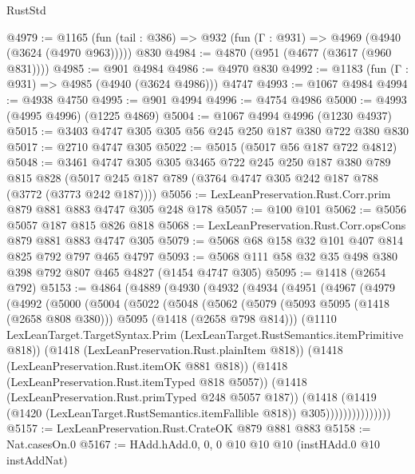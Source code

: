 \begin{lexlean}{RustStd}
\begin{coremodule}
@4979 := @1165
    (fun (tail : @386) => @932 (fun (Γ : @931) => @4969 (@4940 (@3624 (@4970 @963)))))
    @830
@4984 := @4870 (@951 (@4677 (@3617 (@960 @831))))
@4985 := @901 @4984
@4986 := @4970 @830
@4992 := @1183 (fun (Γ : @931) => @4985 (@4940 (@3624 @4986))) @4747
@4993 := @1067 @4984
@4994 := @4938 @4750
@4995 := @901 @4994
@4996 := @4754 @4986
@5000 := @4993 (@4995 @4996) (@1225 @4869)
@5004 := @1067 @4994 @4996 (@1230 @4937)
@5015 := @3403 @4747 @305 @305 @56 @245 @250 @187 @380 @722 @380 @830
@5017 := @2710 @4747 @305
@5022 := @5015 (@5017 @56 @187 @722 @4812)
@5048 := @3461
    @4747
    @305
    @305
    @3465
    @722
    @245
    @250
    @187
    @380
    @789
    @815
    @828
    (@5017 @245 @187 @789 (@3764 @4747 @305 @242 @187 @788 (@3772 (@3773 @242 @187))))
@5056 := LexLeanPreservation.Rust.Corr.prim @879 @881 @883 @4747 @305 @248 @178
@5057 := @100 @101
@5062 := @5056 @5057 @187 @815 @826 @818
@5068 := LexLeanPreservation.Rust.Corr.opsCons @879 @881 @883 @4747 @305
@5079 := @5068 @68 @158 @32 @101 @407 @814 @825 @792 @797 @465 @4797
@5093 := @5068 @111 @58 @32 @35 @498 @380 @398 @792 @807 @465 @4827 (@1454 @4747 @305)
@5095 := @1418 (@2654 @792)
@5153 := @4864
    (@4889
      (@4930
        (@4932
          (@4934
            (@4951
              (@4967
                (@4979
                  (@4992
                    (@5000
                      (@5004
                        (@5022
                          (@5048
                            (@5062
                              (@5079
                                (@5093 @5095 (@1418 (@2658 @808 @380)))
                                @5095
                                (@1418 (@2658 @798 @814)))
                              (@1110
                                LexLeanTarget.TargetSyntax.Prim
                                (LexLeanTarget.RustSemantics.itemPrimitive @818))
                              (@1418 (LexLeanPreservation.Rust.plainItem @818))
                              (@1418 (LexLeanPreservation.Rust.itemOK @881 @818))
                              (@1418 (LexLeanPreservation.Rust.itemTyped @818 @5057))
                              (@1418 (LexLeanPreservation.Rust.primTyped @248 @5057 @187))
                              (@1418
                                (@1419
                                  (@1420 (LexLeanTarget.RustSemantics.itemFallible @818))
                                  @305)))))))))))))))
@5157 := LexLeanPreservation.Rust.CrateOK @879 @881 @883
@5158 := Nat.casesOn.{0}
@5167 := HAdd.hAdd.{0, 0, 0} @10 @10 @10 (instHAdd.{0} @10 instAddNat)

\end{coremodule}
\end{lexlean}
